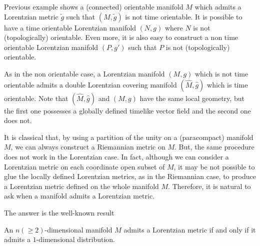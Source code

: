 Previous example shows a (connected) orientable manifold $M$ which admits a Lorentzian metric ${\tilde g}$ such that $(M,{\tilde g})$ is not time orientable. It is possible to have a time orientable Lorentzian manifold $(N,g)$ where $N$ is not (topologically) orientable. Even more, it is also easy to construct a non time orientable Lorentzian manifold $(P,g')$ such that $P$ is not (topologically) orientable.

As in the non orientable case, a Lorentzian manifold $(M,g)$ which is not time orientable admits a double Lorentzian covering manifold $({\hat M},{\hat g})$ which is time orientable. Note that $({\hat M}, {\hat g})$ and $(M,g)$ have the same local geometry, but the first one possesses a globally defined timelike vector field and the second one does not.


It is classical that, by using a partition of the unity on a (paracompact) manifold $M$, we can always construct a Riemannian metric on $M$. But, the same procedure does not work in the Lorentzian case. In fact, although we can consider a Lorentzian metric on each coordinate open subset of $M$, it may be not possible to glue the locally defined Lorentzian metrics, as in the Riemannian case, to produce a Lorentzian metric defined on the whole manifold $M$. Therefore, it is natural to ask when a manifold admits a Lorentzian metric.

The answer is the well-known result \cite{greub72}

\begin{proposition}\label{line_fields}
    An $n(\geq 2)$-dimensional manifold $M$ admits a Lorentzian metric if and only if it admits a $1$-dimensional distribution.
\end{proposition}

